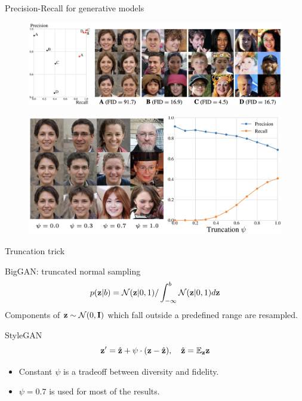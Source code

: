 \begin{frame}{Precision-Recall for generative models}
	\begin{figure}
		\includegraphics[width=\linewidth]{figs/pr_vs_fid}
	\end{figure}
	\begin{figure}
		\includegraphics[width=0.75\linewidth]{figs/pr_truncation}
	\end{figure}
\end{frame}
\begin{frame}{Truncation trick}
	\begin{block}{BigGAN: truncated normal sampling}
		\vspace{-0.3cm}
		\[
			p(\mathbf{z} | b) = \mathcal{N}(\mathbf{z} | 0, 1) / \int_{-\infty}^b \mathcal{N}(\mathbf{z} | 0, 1) d\mathbf{z}
		\]
		Components of $\mathbf{z} \sim \mathcal{N}(0, \mathbf{I})$ which fall outside a predefined range are resampled.
	\end{block}
	
	\begin{block}{StyleGAN}
		\vspace{-0.2cm}
		\[
			\mathbf{z}' = \hat{\mathbf{z}} + \psi \cdot (\mathbf{z} - \hat{\mathbf{z}}), \quad \hat{\mathbf{z}} = \mathbb{E}_{\mathbf{z}} \mathbf{z}
		\]
		\vspace{-0.2cm}
		\begin{itemize}
			\item Constant $\psi$ is a tradeoff between diversity and fidelity. 
			\item $\psi=0.7$ is used for most of the results.
		\end{itemize}
	\end{block}

\end{frame}
